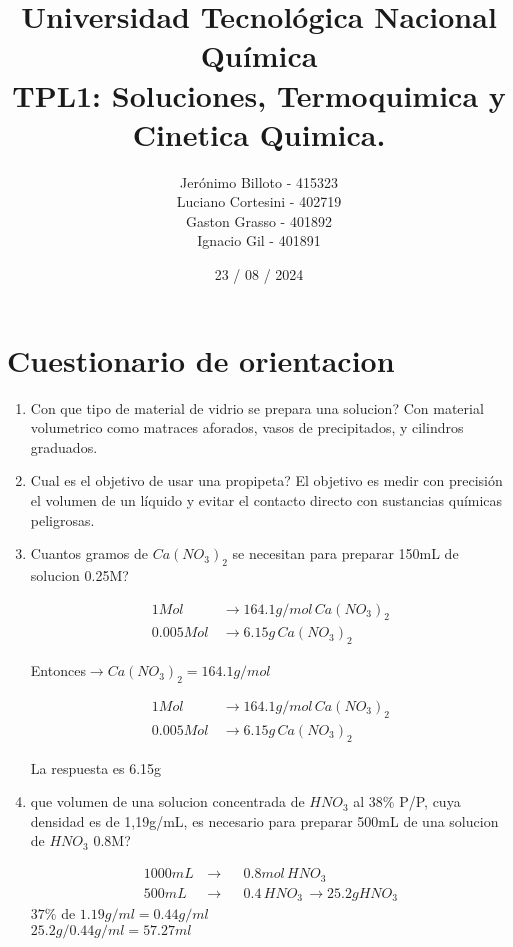 \documentclass[12pt,a4paper]{report}
\title{%
  \fontsize{25}{0}\selectfont Universidad Tecnológica Nacional \\
  \fontsize{22}{30}\selectfont Química \\
  \fontsize{18}{25}\selectfont TPL1: Soluciones, Termoquimica y Cinetica Quimica.
}
\author{
  Jerónimo Billoto - 415323\\
  Luciano Cortesini - 402719\\
  Gaston Grasso - 401892\\
  Ignacio Gil - 401891\\
}
\date{23 / 08 / 2024}
\begin{document}
\maketitle
\section*{Cuestionario de orientacion}

\begin{enumerate}

  \item Con que tipo de material de vidrio se prepara una solucion?
    Con material volumetrico como matraces aforados, vasos de precipitados, y cilindros graduados.
  \item Cual es el objetivo de usar una propipeta?
    El objetivo es medir con precisión el volumen de un líquido y evitar el contacto directo con sustancias químicas peligrosas.
  \item Cuantos gramos de $Ca(NO_3)_2$ se necesitan para preparar 150mL de solucion 0.25M?

\begin{equation*}
\begin{aligned}
1 Mol  \, &\rightarrow 164.1g/mol \,Ca(NO_3)_2\\[6pt]
0.005 Mol  \, &\rightarrow 6.15g \,Ca(NO_3)_2
\end{aligned}
\end{equation*}

    Entonces$ \rightarrow Ca(NO_3)_2= 164.1 g/mol$

\begin{equation*}
\begin{aligned}
1 Mol  \, &\rightarrow 164.1g/mol \,Ca(NO_3)_2\\[6pt]
0.005 Mol  \, &\rightarrow 6.15g \,Ca(NO_3)_2
\end{aligned}
\end{equation*}

La respuesta es 6.15g\\
  \item que volumen de  una solucion concentrada de $HNO_3$ al $38\% $ P/P, cuya densidad es de 1,19g/mL, es necesario para preparar 500mL de una solucion de $HNO_3$ 0.8M?
 
    $$
    \begin{aligned}
    1000mL \,  &\rightarrow&& 0.8 mol \,HNO_3\\[6pt]
    500mL\,  &\rightarrow&& 0.4 \,HNO_3\, \rightarrow 25.2g HNO_3
    \end{aligned}
    $$
    $37\%$ de $1.19g/ml = 0.44g/ml$\\
    $25.2g/0.44g/ml=57.27ml$\\

\end{enumerate}
\end{document}
